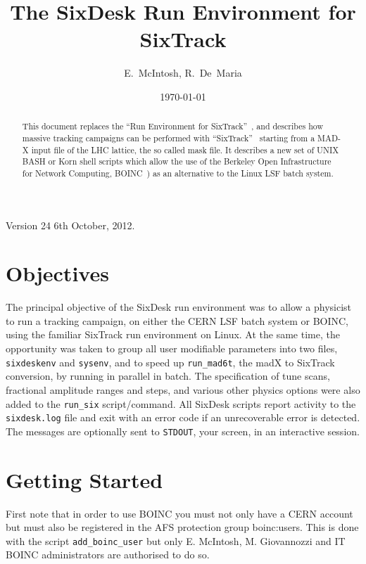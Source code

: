 \documentclass{cernatsnote}    %
\begin{document}
\begin{titlepage}
\date{\today}
\title{The SixDesk Run Environment for SixTrack} 
\author{E.~McIntosh, R.~De~Maria}

\maketitle
 
\begin{abstract}
  This document replaces the ``Run Environment for 
  SixTrack''~\cite{Runsix},
  and describes how massive tracking campaigns can be
  performed with ``SixTrack''~\cite{SixTrack} starting from a MAD-X input
  file of the LHC lattice, the so called mask file. It describes a new set 
  of UNIX BASH or Korn shell scripts which allow the use of 
  the Berkeley Open Infrastructure for
 Network Computing, BOINC~\cite{Boinc}) as an alternative to the Linux LSF batch system.
\end{abstract}

\end{titlepage}
%
Version 24 6th October, 2012.

\section{Objectives}
%
The principal objective of the SixDesk run environment was to allow a physicist to
run a tracking campaign, on either the CERN LSF batch system or BOINC,
using the familiar SixTrack run environment on Linux. 
At the same time, the opportunity was taken to group all
user modifiable parameters into two files, {\tt sixdeskenv} and {\tt sysenv}, 
and to speed up
{\tt run\_mad6t}, the madX to SixTrack conversion, by running in parallel in batch. 
The specification of tune scans, fractional amplitude ranges and steps, and various
other physics options were also added to the {\tt run\_six} script/command.
All SixDesk scripts report activity to the {\tt sixdesk.log} file
and exit with an error code if an unrecoverable error is detected.
The messages are optionally sent to {\tt STDOUT}, your screen, in an interactive
session.
%
\section{Getting Started}
First note that in order to use BOINC you must not only have a CERN account
but must also be registered in the
AFS protection group boinc:users. This is done with the script
{\tt add\_boinc\_user} but only E. McIntosh, M. Giovannozzi and
IT BOINC administrators are authorised to do so.
\end{document}
